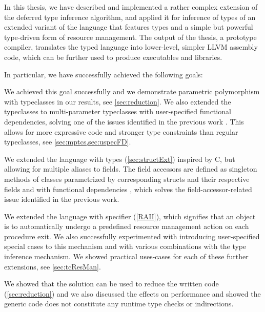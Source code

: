 

In this thesis, we have described and implemented a rather complex extension of the deferred type inference algorithm, and applied it for inference of types of an extended variant of the \cmm language that features types and a simple but powerful type-driven form of resource management. The output of the thesis, a prototype compiler, translates the typed \cmm language into lower-level, simpler LLVM assembly code, which can be further used to produce executables and libraries.

In particular, we have successfully achieved the following goals:

\begin{description}
    \small
    \item[Extend \cmm with parametric polymorphism with typeclasses] We achieved this goal successfully and we demonstrate parametric polymorphism with typeclasses in our results, see \cref{sec:reduction}. We also extended the typeclasses to multi-parameter typeclasses with user-specified functional dependencies, solving one of the issues identified in the previous work \cite{klepl2020type}. This allows for more expressive code and stronger type constraints than regular typeclasses, see \cref{sec:mptcs,sec:uspecFD}.

    \item[Extend \cmm with record types]  We extended the language with  types (\cref{sec:structExt}) inspired by C, but allowing for multiple aliases to fields. The field accessors are defined as singleton methods of classes parametrized by corresponding structs and their respective fields and with functional dependencies , which solves the field-accessor-related issue identified in the previous work.

    \item[Extend \cmm with automatic resource management features] We extended the language with  specifier (\cref{RAII}), which signifies that an object is to automatically undergo a predefined resource management action on each procedure exit. We also successfully experimented with introducing user-specified special cases to this mechanism and with various combinations with the type inference mechanism. We showed practical uses-cases for each of these further extensions, see \cref{sec:tcResMan}.

    \item[The solution should simplify implementation of low-level software] We showed that the solution can be used to reduce the written code (\cref{sec:reduction}) and we also discussed the effects on performance and showed the generic code does not constitute any runtime type checks or indirections.


\end{description}
